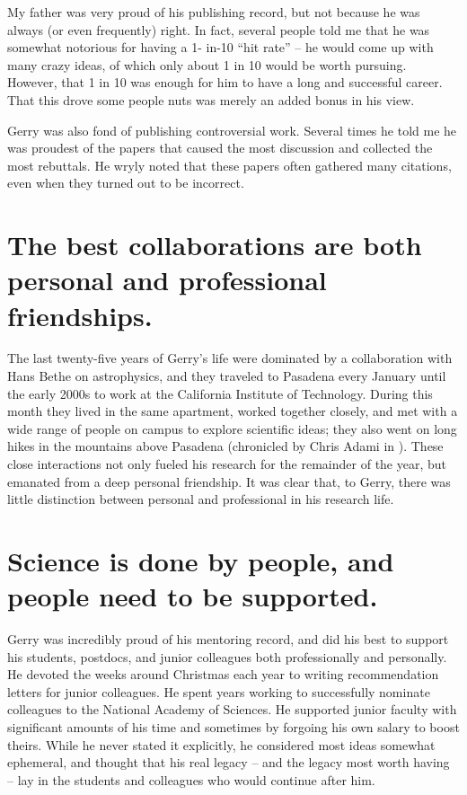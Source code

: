\documentclass{ws-rv9x6}
\begin{document}
My father was very proud of his publishing record, but not because he
was always (or even frequently) right. In fact, several people told me
that he was somewhat notorious for having a 1- in-10 ``hit rate'' -- he
would come up with many crazy ideas, of which only about 1 in 10 would
be worth pursuing. However, that 1 in 10 was enough for him to have a
long and successful career.  That this drove some people nuts was
merely an added bonus in his view.

Gerry was also fond of publishing controversial work. Several times he
told me he was proudest of the papers that caused the most discussion
and collected the most rebuttals. He wryly noted that these
papers often gathered many citations, even when they
turned out to be incorrect.

\section*{The best collaborations are both personal and professional
friendships.}

The last twenty-five years of Gerry's life were dominated by a
collaboration with Hans Bethe on astrophysics, and they traveled to
Pasadena every January until the early 2000s to work at the California
Institute of Technology. During this month they lived in the same
apartment, worked together closely, and met with a wide range of
people on campus to explore scientific ideas; they also went on long
hikes in the mountains above Pasadena (chronicled by Chris Adami in
\cite{adami2006three}). These close interactions not only fueled his
research for the remainder of the year, but emanated from a deep personal
friendship. It was clear that, to Gerry, there was little distinction
between personal and professional in his research life.

\section*{Science is done by people, and people need to be supported.}

Gerry was incredibly proud of his mentoring record, and did his best
to support his students, postdocs, and junior colleagues both
professionally and personally. He devoted the weeks around Christmas
each year to writing recommendation letters for junior colleagues. He
spent years working to successfully nominate colleagues to the
National Academy of Sciences. He supported junior faculty with
significant amounts of his time and sometimes by forgoing his own
salary to boost theirs. While he never stated it explicitly, he
considered most ideas somewhat ephemeral, and thought that his real
legacy -- and the legacy most worth having -- lay in the students and
colleagues who would continue after him.
\end{document}
